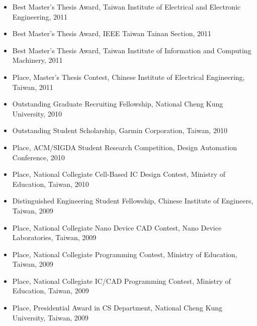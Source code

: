 \documentclass[A4,11pt]{article}
\begin{document}
\begin{itemize}
    \item Best Master’s Thesis Award, Taiwan Institute of Electrical and Electronic Engineering, 2011
    \item Best Master’s Thesis Award, IEEE Taiwan Tainan Section, 2011
    \item Best Master’s Thesis Award, Taiwan Institute of Information and Computing Machinery, 2011
    \item {} Place, Master’s Thesis Contest, Chinese Institute of Electrical Engineering, Taiwan, 2011
    \item Outstanding Graduate Recruiting Fellowship, National Cheng Kung University, 2010
    \item Outstanding Student Scholarship, Garmin Corporation, Taiwan, 2010
    \item {} Place, ACM/SIGDA Student Research Competition, Design Automation Conference, 2010
    \item {} Place, National Collegiate Cell-Based IC Design Contest, Ministry of Education, Taiwan, 2010
    \item Distinguished Engineering Student Fellowship, Chinese Institute of Engineers, Taiwan, 2009
    \item {} Place, National Collegiate Nano Device CAD Contest, Nano Device Laboratories, Taiwan, 2009
    \item {} Place, National Collegiate Programming Contest, Ministry of Education, Taiwan, 2009
    \item {} Place, National Collegiate IC/CAD Programming Contest, Ministry of Education, Taiwan, 2009
    \item {} Place, Presidential Award in CS Department, National Cheng Kung University, Taiwan, 2009

 \end{itemize}

\end{document}
